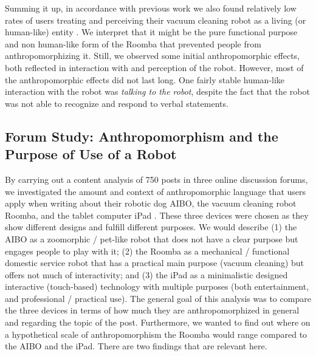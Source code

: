 \documentclass{frontiersSCNS} %
\begin{document}
Summing it up, in accordance with previous work we also found relatively low rates of users
treating and perceiving their vacuum cleaning robot as a living (or human-like)
entity \citep{sung_housewives_2008}. We interpret that it might be the pure
functional purpose and non human-like form of the Roomba that prevented people
from anthropomorphizing it. Still, we observed some initial anthropomorphic
effects, both reflected in interaction with and perception of the robot.
However, most of the anthropomorphic effects did not last long. One fairly
stable human-like interaction with the robot was \textit{talking to the robot},
despite the fact that the robot was not able to recognize and respond to verbal
statements.

%
%
%
%
%
%


\subsection{Forum Study: Anthropomorphism and the Purpose of Use of a Robot}
\label{sec:forum-study}


By carrying out a content analysis of 750 posts in three online discussion forums, we investigated the amount and context of anthropomorphic language that users apply when writing about their robotic dog AIBO, the vacuum cleaning robot
Roomba, and the tablet computer iPad \citep{fink_anthropomorphic_2012}. These three devices were chosen as they show different designs and
fulfill different purposes. We would describe (1) the AIBO as a zoomorphic /
pet-like robot that does not have a clear purpose but engages people to play
with it; (2) the Roomba as a mechanical / functional domestic service robot that has
a practical main purpose (vacuum cleaning) but offers not much of interactivity;
and (3) the iPad as a minimalistic designed interactive (touch-based) technology
with multiple purposes (both entertainment, and professional / practical use). The general goal of this analysis was to compare the three devices in terms of how much they are anthropomorphized in general and regarding the topic of the post. Furthermore, we wanted to find out where on a hypothetical scale of anthropomorphism the Roomba would range compared to the AIBO and the iPad.
There are two findings that are relevant here. 
\end{document}
